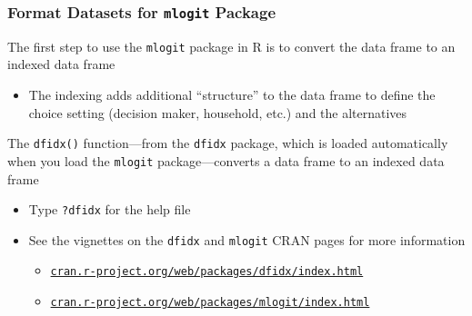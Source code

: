 \documentclass{beamer}\usepackage[]{graphicx}\usepackage[]{xcolor}
\begin{document}
\begin{frame}\frametitle{Format Datasets for \texttt{mlogit} Package}
    The first step to use the \texttt{mlogit} package in R is to convert the data frame to an indexed data frame
    \begin{itemize}
    	\item The indexing adds additional ``structure'' to the data frame to define the choice setting (decision maker, household, etc.) and the alternatives
    \end{itemize}
    \vspace{2ex}
    The \texttt{dfidx()} function---from the \texttt{dfidx} package, which is loaded automatically when you load the \texttt{mlogit} package---converts a data frame to an indexed data frame
    \begin{itemize}
    	\item Type \texttt{?dfidx} for the help file
    	\item See the vignettes on the \texttt{dfidx} and \texttt{mlogit} CRAN pages for more information
    	\begin{itemize}
    		\item \href{https://cran.r-project.org/web/packages/dfidx/index.html}{\texttt{cran.r-project.org/web/packages/dfidx/index.html}}
    		\item \href{https://cran.r-project.org/web/packages/mlogit/index.html}{\texttt{cran.r-project.org/web/packages/mlogit/index.html}}
    	\end{itemize}
    \end{itemize}
\end{frame}
\end{document}
